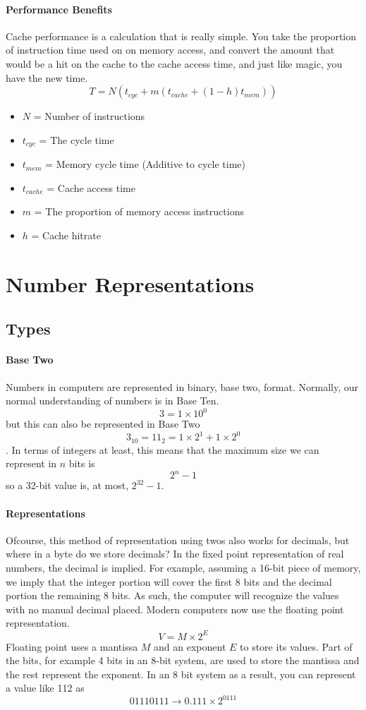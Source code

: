 \paragraph{Performance Benefits}
Cache performance is a calculation that is really simple. You take the proportion of instruction time used on on memory access, and convert the amount that would be a hit on the cache to the cache access time, and just like magic, you have the new time. \[T = N(t_{cyc} + m(t_{cache} + (1-h)t_{mem}))\]
\begin{itemize}
	\item $N$ = Number of instructions
	\item $t_{cyc}$ = The cycle time
	\item $t_{mem}$ = Memory cycle time (Additive to cycle time)
	\item $t_{cache}$ = Cache access time
	\item $m$ = The proportion of memory access instructions
	\item $h$ = Cache hitrate
\end{itemize}
\section{Number Representations}
\subsection{Types}
\paragraph{Base Two}
Numbers in computers are represented in binary, base two, format. Normally, our normal understanding of numbers is in Base Ten. \[3 = 1 \times 10^0\] but this can also be represented in Base Two \[3_10 = 11_2 = 1 \times 2^1 + 1 \times 2^0\]. In terms of integers at least, this means that the maximum size we can represent in $n$ bits is \[2^n - 1\] so a 32-bit value is, at most, $2^{32} - 1$.
\paragraph{Representations}
Ofcourse, this method of representation using twos also works for decimals, but where in a byte do we store decimals? In the fixed point representation of real numbers, the decimal is implied. For example, assuming a 16-bit piece of memory, we imply that the integer portion will cover the first 8 bits and the decimal portion the remaining 8 bits. As such, the computer will recognize the values with no manual decimal placed.
Modern computers now use the floating point representation. \[V = M \times 2^E\] Floating point uses a mantissa $M$ and an exponent $E$ to store its values. Part of the bits, for example 4 bits in an 8-bit system, are used to store the mantissa and the rest represent the exponent. In an 8 bit system as a result, you can represent a value like 112 as \[01110111 \rightarrow 0.111 \times 2^{0111}\]
